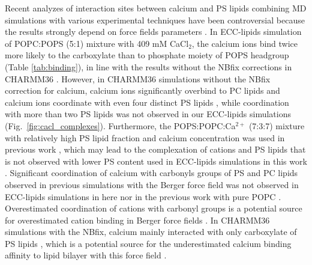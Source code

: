 \documentclass[journal=jpcbfk,manuscript=article]{achemso}
\begin{document}
Recent analyzes of interaction sites between calcium and PS lipids combining
MD simulations with various experimental techniques have been 
controversial because the results strongly depend on force fields parameters \cite{melcrova16,valentine18,hallock18}.
In ECC-lipids simulation of POPC:POPS (5:1) mixture with 409 mM CaCl$_2$,
the calcium ions bind twice more likely to the carboxylate than to phosphate moiety of POPS headgroup
 (Table \ref{tab:binding}),
in line with the results without the NBfix corrections in CHARMM36 \cite{hallock18}.
However, in CHARMM36 simulations without the NBfix correction for calcium,
calcium ions significantly overbind to PC lipids  \cite{catte16} and calcium ions coordinate
with even four distinct PS lipids \cite{hallock18}, while coordination with more than two PS lipids
was not observed in our ECC-lipids simulations (Fig.~\ref{fig:cacl_complexes}).
Furthermore, the POPS:POPC:Ca$^{2+}$ (7:3:7) mixture with relatively high
PS lipid fraction and calcium concentration was used in previous work \cite{hallock18},
which may lead to the complexation of  cations and PS lipids that is
not observed with lower PS content used in ECC-lipids simulations in this work \cite{hauser77,kurland79,hauser85,feigenson86,mattai89,roux90,roux91}.
Significant coordination of calcium with carbonyls groups of PS and PC lipids observed in previous
simulations with the Berger force field \cite{melcrova16} %
was not observed in ECC-lipids simulations in here nor in the previous work with pure POPC \cite{melcr18}.
Overestimated coordination of cations with carbonyl groups is a potential source for
overestimated cation binding in Berger force fields \cite{catte16,NMRlipidsIV}. 
In CHARMM36 simulations with the NBfix, calcium mainly interacted with only
carboxylate of PS lipids  \cite{valentine18}, which is a potential source for the
underestimated calcium binding affinity to lipid bilayer with this force field \cite{NMRlipidsIV}. 
\end{document}

